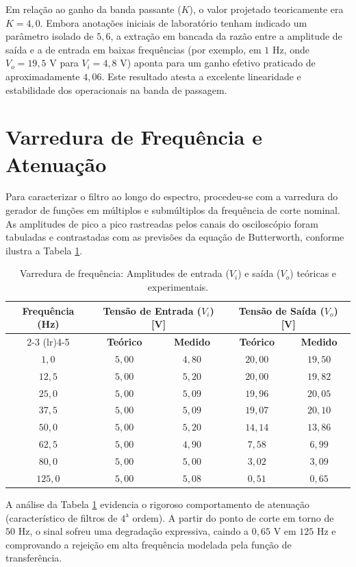 Em relação ao ganho da banda passante ($K$), o valor projetado teoricamente era $K=4,0$. Embora anotações iniciais de laboratório tenham indicado um parâmetro isolado de $5,6$, a extração em bancada da razão entre a amplitude de saída e a de entrada em baixas frequências (por exemplo, em $1\text{ Hz}$, onde $V_{o} = 19,5\text{ V}$ para $V_{i} = 4,8\text{ V}$) aponta para um ganho efetivo praticado de aproximadamente $4,06$. Este resultado atesta a excelente linearidade e estabilidade dos operacionais na banda de passagem.

\section{Varredura de Frequência e Atenuação}

Para caracterizar o filtro ao longo do espectro, procedeu-se com a varredura do gerador de funções em múltiplos e submúltiplos da frequência de corte nominal. As amplitudes de pico a pico rastreadas pelos canais do osciloscópio foram tabuladas e contrastadas com as previsões da equação de Butterworth, conforme ilustra a Tabela \ref{tab:varredura_frequencia}.

\begin{table}[htbp]
	\centering
	\caption{Varredura de frequência: Amplitudes de entrada ($V_i$) e saída ($V_o$) teóricas e experimentais.}
	\label{tab:varredura_frequencia}
	\begin{tabular}{ccccc}
		\toprule
		\multirow{2}{*}{\textbf{Frequência (Hz)}} & \multicolumn{2}{c}{\textbf{Tensão de Entrada ($V_{i}$) [V]}} & \multicolumn{2}{c}{\textbf{Tensão de Saída ($V_{o}$) [V]}} \\
		\cmidrule(lr){2-3} \cmidrule(lr){4-5}
		& \textbf{Teórico} & \textbf{Medido} & \textbf{Teórico} & \textbf{Medido} \\
		\midrule
		$1,0$   & $5,00$ & $4,80$ & $20,00$ & $19,50$ \\
		$12,5$  & $5,00$ & $5,20$ & $20,00$ & $19,82$ \\
		$25,0$  & $5,00$ & $5,09$ & $19,96$ & $20,05$ \\
		$37,5$  & $5,00$ & $5,09$ & $19,07$ & $20,10$ \\
		$50,0$  & $5,00$ & $5,20$ & $14,14$ & $13,86$ \\
		$62,5$  & $5,00$ & $4,90$ & $7,58$  & $6,99$  \\
		$80,0$  & $5,00$ & $5,00$ & $3,02$  & $3,09$  \\
		$125,0$ & $5,00$ & $5,08$ & $0,51$  & $0,65$  \\
		\bottomrule
	\end{tabular}
\end{table}

A análise da Tabela \ref{tab:varredura_frequencia} evidencia o rigoroso comportamento de atenuação (característico de filtros de $4^{\text{a}}$ ordem). A partir do ponto de corte em torno de $50\text{ Hz}$, o sinal sofreu uma degradação expressiva, caindo a $0,65\text{ V}$ em $125\text{ Hz}$ e comprovando a rejeição em alta frequência modelada pela função de transferência.